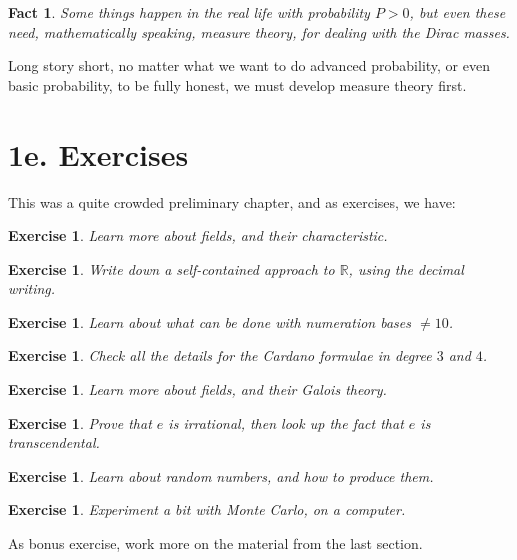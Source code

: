 \documentclass[12pt]{amsbook}
\newtheorem{exercise}[theorem]{Exercise}
\newtheorem{fact}[theorem]{Fact}
\begin{document}
\begin{fact}
Some things happen in the real life with probability $P>0$, but even these need, mathematically speaking, measure theory, for dealing with the Dirac masses.
\end{fact}

Long story short, no matter what we want to do advanced probability, or even basic probability, to be fully honest, we must develop measure theory first.

\section*{1e. Exercises}

This was a quite crowded preliminary chapter, and as exercises, we have:

\begin{exercise}
Learn more about fields, and their characteristic.
\end{exercise}

\begin{exercise}
Write down a self-contained approach to $\mathbb R$, using the decimal writing.
\end{exercise}

\begin{exercise}
Learn about what can be done with numeration bases $\neq10$.
\end{exercise}

\begin{exercise}
Check all the details for the Cardano formulae in degree $3$ and $4$.
\end{exercise}

\begin{exercise}
Learn more about fields, and their Galois theory.
\end{exercise}

\begin{exercise}
Prove that $e$ is irrational, then look up the fact that $e$ is transcendental.
\end{exercise}

\begin{exercise}
Learn about random numbers, and how to produce them.
\end{exercise}

\begin{exercise}
Experiment a bit with Monte Carlo, on a computer.
\end{exercise}

As bonus exercise, work more on the material from the last section.
\end{document}
